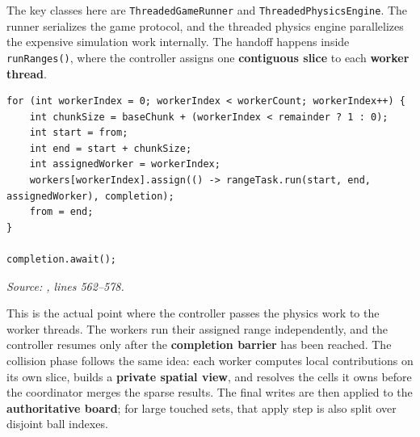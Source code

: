 The key classes here are \texttt{ThreadedGameRunner} and \texttt{ThreadedPhysicsEngine}. The runner serializes the game protocol, and the threaded physics engine parallelizes the expensive simulation work internally. The handoff happens inside \texttt{runRanges()}, where the controller assigns one \textbf{contiguous slice} to each \textbf{worker thread}.

\begin{lstlisting}[style=codestyle,caption={Threaded handoff from controller to workers},label={lst:threaded-handoff}]
for (int workerIndex = 0; workerIndex < workerCount; workerIndex++) {
    int chunkSize = baseChunk + (workerIndex < remainder ? 1 : 0);
    int start = from;
    int end = start + chunkSize;
    int assignedWorker = workerIndex;
    workers[workerIndex].assign(() -> rangeTask.run(start, end, assignedWorker), completion);
    from = end;
}

completion.await();
\end{lstlisting}

\noindent\textit{Source: , lines 562--578.}

This is the actual point where the controller passes the physics work to the worker threads. The workers run their assigned range independently, and the controller resumes only after the \textbf{completion barrier} has been reached. The collision phase follows the same idea: each worker computes local contributions on its own slice, builds a \textbf{private spatial view}, and resolves the cells it owns before the coordinator merges the sparse results. The final writes are then applied to the \textbf{authoritative board}; for large touched sets, that apply step is also split over disjoint ball indexes.

